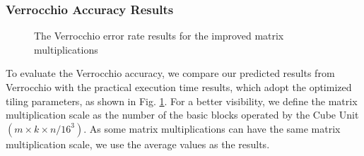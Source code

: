 \documentclass[12pt]{extbook}
\begin{document}
\subsubsection{Verrocchio Accuracy Results}

\begin{figure}[tbp]
\captionsetup{justification=centering}
\caption{The Verrocchio error rate results for the improved matrix multiplications}
\label{fig:sim}
\end{figure}

To evaluate the Verrocchio accuracy, we compare our predicted results from Verrocchio with the practical execution time results, which adopt the optimized tiling parameters, as shown in Fig. \ref{fig:sim}. For a better visibility, we define the matrix multiplication scale as the number of the basic blocks operated by the Cube Unit $(m \times k \times n / 16 ^ 3)$. As some matrix multiplications can have the same matrix multiplication scale, we use the average values as the results.
\end{document}
